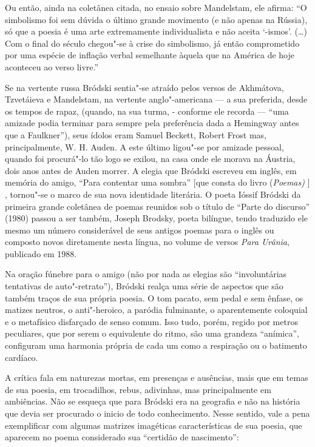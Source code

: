 Ou então, ainda na coletânea citada, no ensaio sobre Mandelstam, ele
afirma: ``O simbolismo foi sem dúvida o último grande movimento (e não
apenas na Rússia), só que a poesia é uma arte extremamente
individualista e não aceita `-ismos'. (\ldots{}) Com o final do século
chegou"-se à crise do simbolismo, já então comprometido por uma espécie
de inflação verbal semelhante àquela que na América de hoje aconteceu ao
verso livre.''

Se na vertente russa Bródski sentia"-se atraído pelos versos de
Akhmátova, Tzvetáieva e Mandelstam, na vertente anglo"-americana --- a sua
preferida, desde os tempos de rapaz, (quando, na sua turma, - conforme
ele recorda --- ``uma amizade podia terminar para sempre pela preferência
dada a Hemingway antes que a Faulkner''), seus ídolos eram Samuel
Beckett, Robert Frost mas, principalmente, W. H. Auden. A este último
ligou"-se por amizade pessoal, quando foi procurá"-lo tão logo se exilou,
na casa onde ele morava na Áustria, dois anos antes de Auden morrer. A
elegia que Bródski escreveu em inglês, em memória do amigo, ``Para
contentar uma sombra'' {[}que consta do livro \emph{ }
(\emph{Poemas)} {]} , tornou"-se o marco de sua nova identidade
literária. O poeta Ióssif Bródski da primeira grande coletânea de poemas
reunidos sob o título de ``Parte do discurso'' (1980) passou a ser
também, Joseph Brodsky, poeta bilíngue, tendo traduzido ele mesmo um
número considerável de seus antigos poemas para o inglês ou composto
novos diretamente nesta língua, no volume de versos \emph{Para Urânia},
publicado em 1988.

Na oração fúnebre para o amigo (não por nada as elegias são
``involuntárias tentativas de auto"-retrato''), Bródski realça uma série
de aspectos que são também traços de sua própria poesia. O tom pacato,
sem pedal e sem ênfase, os matizes neutros, o anti"-heroico, a paródia
fulminante, o aparentemente coloquial e o metafísico disfarçado de senso
comum. Isso tudo, porém, regido por metros peculiares, que por serem o
equivalente do ritmo, são uma grandeza ``anímica'', configuram uma
harmonia própria de cada um como a respiração ou o batimento cardíaco.

A crítica fala em naturezas mortas, em presenças e ausências, mais que
em temas de sua poesia, em trocadilhos, rebus, adivinhas, mas
principalmente em ambiências. Não se esqueça que para Bródski era na
geografia e não na história que devia ser procurado o inicio de todo
conhecimento. Nesse sentido, vale a pena exemplificar com algumas
matrizes imagéticas características de sua poesia, que aparecem no poema
considerado sua ``certidão de nascimento'':

